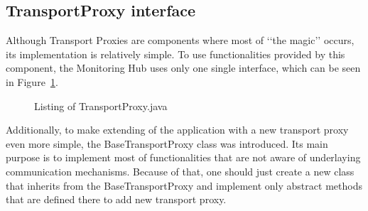 \subsection{TransportProxy interface}
\label{subs:TransportProxyInterface}

Although Transport Proxies are components where most of \lq\lq{}the magic\rq\rq{} occurs, its implementation is relatively simple. To use functionalities provided by this component, the Monitoring Hub uses only one single interface, which can be seen in Figure~\ref{fig:transport_proxy}.

\begin{figure}[ht]
  \centering
  
  \caption{Listing of TransportProxy.java}
  \label{fig:transport_proxy}
\end{figure} 

Additionally, to make extending of the application with a new transport proxy even more simple, the BaseTransportProxy class was introduced. Its main purpose is to implement most of functionalities that are not aware of underlaying communication mechanisms. Because of that, one should just create a new class that inherits from the BaseTransportProxy and implement only abstract methods that are defined there to add new transport proxy.
